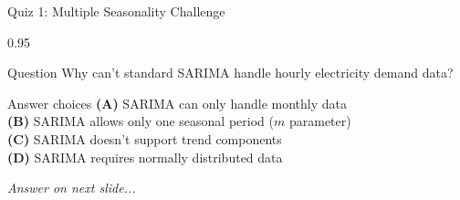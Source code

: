 \documentclass[9pt, aspectratio=169, t]{beamer}
\begin{document}
\begin{frame}{Quiz 1: Multiple Seasonality Challenge}
    \begin{cminipage}{0.95\textwidth}
    \begin{alertblock}{Question}
        Why can't standard SARIMA handle hourly electricity demand data?
    \end{alertblock}

    \vspace{0.4cm}

    \begin{block}{Answer choices}
        \textcolor{MainBlue}{\textbf{(A)}} SARIMA can only handle monthly data\\[3pt]
        \textcolor{MainBlue}{\textbf{(B)}} SARIMA allows only one seasonal period ($m$ parameter)\\[3pt]
        \textcolor{MainBlue}{\textbf{(C)}} SARIMA doesn't support trend components\\[3pt]
        \textcolor{MainBlue}{\textbf{(D)}} SARIMA requires normally distributed data
    \end{block}

    \vspace{0.5cm}

    \begin{center}
        \textit{Answer on next slide...}
    \end{center}
    \end{cminipage}
\end{frame}
\end{document}
